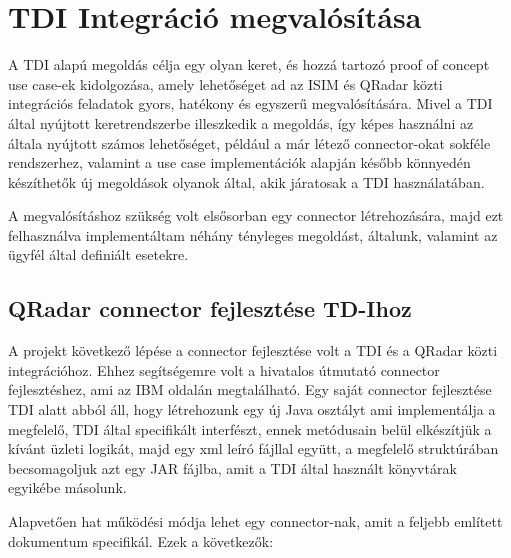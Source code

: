 \section{TDI Integráció megvalósítása}
A TDI alapú megoldás célja egy olyan keret, és hozzá tartozó proof of concept use case-ek kidolgozása, amely lehetőséget ad az ISIM és QRadar közti integrációs feladatok gyors, hatékony és egyszerű megvalósítására. Mivel a TDI által nyújtott keretrendszerbe illeszkedik a megoldás, így képes használni az általa nyújtott számos lehetőséget, például a már létező connector-okat sokféle rendszerhez, valamint a use case implementációk alapján később könnyedén készíthetők új megoldások olyanok által, akik járatosak a TDI használatában. 

A megvalósításhoz szükség volt elsősorban egy connector létrehozására, majd ezt felhasználva implementáltam néhány tényleges megoldást, általunk, valamint az ügyfél által definiált esetekre.
 
\subsection{QRadar connector fejlesztése TD-Ihoz}

A projekt következő lépése a connector fejlesztése volt a TDI és a QRadar közti integrációhoz. Ehhez segítségemre volt a hivatalos útmutató connector fejlesztéshez, ami az IBM oldalán megtalálható. Egy saját connector fejlesztése TDI alatt abból áll, hogy létrehozunk egy új Java osztályt ami implementálja a megfelelő, TDI által specifikált interfészt, ennek metódusain belül elkészítjük a kívánt üzleti logikát, majd egy xml leíró fájllal együtt, a megfelelő struktúrában becsomagoljuk azt egy JAR fájlba, amit a TDI által használt könyvtárak egyikébe másolunk. 

Alapvetően hat működési módja lehet egy connector-nak, amit a feljebb említett dokumentum specifikál. Ezek a következők:


